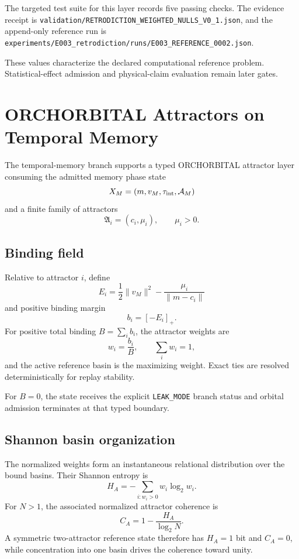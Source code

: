 \documentclass[11pt]{book}
\begin{document}
The targeted test suite for this layer records five passing checks. The evidence receipt is
\texttt{validation/RETRODICTION\_WEIGHTED\_NULLS\_V0\_1.json},
and the append-only reference run is
\texttt{experiments/E003\_retrodiction/runs/E003\_REFERENCE\_0002.json}.

These values characterize the declared computational reference problem. Statistical-effect admission and physical-claim evaluation remain later gates.

\chapter{ORCHORBITAL Attractors on Temporal Memory}

The temporal-memory branch supports a typed ORCHORBITAL attractor layer consuming the admitted memory phase state
\[
X_M=(m,v_M,\tau_{\rm int},\mathcal A_M)
\]
and a finite family of attractors
\[
\mathfrak A_i=(c_i,\mu_i),
\qquad \mu_i>0.
\]

\section{Binding field}

Relative to attractor \(i\), define
\[
\boxed{
E_i=\frac12\|v_M\|^2-\frac{\mu_i}{\|m-c_i\|}
}
\]
and positive binding margin
\[
\boxed{b_i=[-E_i]_+.}
\]
For positive total binding \(B=\sum_i b_i\), the attractor weights are
\[
\boxed{w_i=\frac{b_i}{B}},
\qquad
\sum_iw_i=1,
\]
and the active reference basin is the maximizing weight. Exact ties are resolved deterministically for replay stability.

For \(B=0\), the state receives the explicit \texttt{LEAK\_MODE} branch status and orbital admission terminates at that typed boundary.

\section{Shannon basin organization}

The normalized weights form an instantaneous relational distribution over the bound basins. Their Shannon entropy is
\[
\boxed{
H_A=-\sum_{i:w_i>0}w_i\log_2w_i.
}
\]
For \(N>1\), the associated normalized attractor coherence is
\[
\boxed{
C_A=1-\frac{H_A}{\log_2N}.
}
\]
A symmetric two-attractor reference state therefore has \(H_A=1\) bit and \(C_A=0\), while concentration into one basin drives the coherence toward unity.
\end{document}
